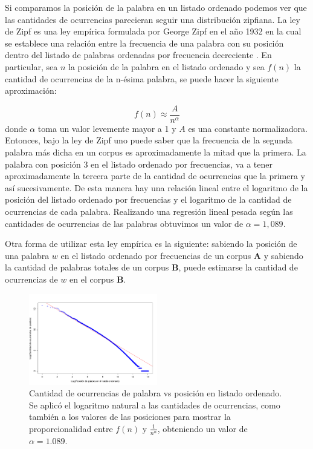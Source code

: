 Si comparamos la posición de la palabra en un listado ordenado podemos ver que  las cantidades de ocurrencias parecieran seguir una distribución zipfiana. La ley de Zipf es una ley empírica formulada por George Zipf en el año 1932 en la cual se establece una relación entre la frecuencia de una palabra con su posición dentro del listado de palabras ordenadas por frecuencia decreciente \cite{montemurro2001beyond, zipf2016human}. En particular, sea $n$ la posición de la palabra en el listado ordenado y sea $f(n)$ la cantidad de ocurrencias de la n-ésima palabra, se puede hacer la siguiente aproximación:

$$f(n) \approx \frac{A}{n^{\alpha}}$$
donde $\alpha$ toma un valor levemente mayor a 1 y $A$ es una constante normalizadora.
Entonces, bajo la ley de Zipf uno puede saber que la frecuencia de la segunda palabra más dicha en un corpus es aproximadamente la mitad que la primera. La palabra con posición 3 en el listado ordenado por frecuencias, va a tener aproximadamente la tercera parte de la cantidad de ocurrencias que la primera y así sucesivamente. De esta manera hay una relación lineal entre el logaritmo de la posición del listado ordenado por frecuencias y el logaritmo de la cantidad de ocurrencias de cada palabra. Realizando una regresión lineal pesada según las cantidades de ocurrencias de las palabras obtuvimos un valor de $\alpha = 1,089$.

Otra forma de utilizar esta ley empírica es la siguiente:
sabiendo la posición de una palabra $w$ en el listado ordenado por frecuencias de un corpus \textbf{A} y sabiendo la cantidad de palabras totales de un corpus \textbf{B}, puede estimarse la cantidad de ocurrencias de $w$ en el corpus \textbf{B}.


\begin{figure}[!ht]
\centering
\includegraphics[width=0.5\textwidth]{images/zipfTodas.pdf}
\caption{Cantidad de ocurrencias de palabra vs posición en listado ordenado. Se aplicó el logaritmo natural a las cantidades de ocurrencias, como también a los valores de las posiciones para mostrar la proporcionalidad entre $f(n)$ y $\frac{1}{n^{\alpha}}$, obteniendo un valor de $\alpha=1.089$. } 
\label{fig:zipf} 
\end{figure}



